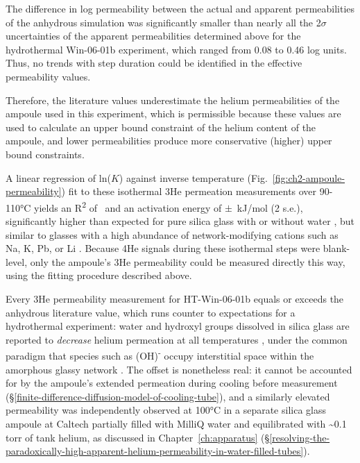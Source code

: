 The difference in log permeability between the actual and apparent
permeabilities of the anhydrous simulation was significantly smaller
than nearly all the 2$\sigma$ uncertainties of the apparent permeabilities
determined above for the hydrothermal Win-06-01b experiment, which
ranged from 0.08 to 0.46 log units. Thus, no trends with step duration could be identified in the
effective permeability values. 

Therefore, the literature values underestimate the helium
permeabilities of the ampoule used in this experiment, which is permissible because these values are used
to calculate an upper bound constraint of the helium content of the ampoule, and lower permeabilities produce more
conservative (higher) upper bound constraints.

A linear regression of ln($K$) against inverse temperature (Fig.~\ref{fig:ch2-ampoule-permeability}) fit to these isothermal
3He permeation measurements over 90-110°C yields an R\textsuperscript{2} of \ChTwoPermRtwo\ and an activation energy of
\ChTwoPermEakJ$\pm$\ChTwoPermEaErrkJ\ kJ/mol (2 s.e.), significantly higher than expected for pure silica glass with or without water
\citep{swets1961,jones1953,masaryk1968,shelby1972}, but similar to glasses with a high abundance of network-modifying cations such as
Na, K, Pb, or Li \citep{norton1953,altemose1961}. Because 4He signals during these isothermal steps were blank-level,
only the ampoule's 3He permeability could be measured directly this way, using the fitting procedure described above.

Every 3He permeability measurement for HT-Win-06-01b equals or exceeds the anhydrous literature value, which
runs counter to expectations for a hydrothermal experiment: water and hydroxyl groups dissolved in silica glass are
reported to \emph{decrease} helium permeation at all temperatures \citep{tsuru2011,shelby1972,masaryk1968}, under the
common paradigm that species such as (OH)\textsuperscript{-} occupy interstitial space within the amorphous glassy
network \citep{norton1953,shackelford1999}. The offset is nonetheless real: it cannot be accounted for by the ampoule's
extended permeation during cooling before measurement (\S\ref{finite-difference-diffusion-model-of-cooling-tube}), and a
similarly elevated permeability was independently observed at 100°C in a separate silica glass ampoule at Caltech
partially filled with MilliQ water and equilibrated with \textasciitilde0.1 torr of tank helium, as discussed in
Chapter~\ref{ch:apparatus} (\S\ref{resolving-the-paradoxically-high-apparent-helium-permeability-in-water-filled-tubes}).

